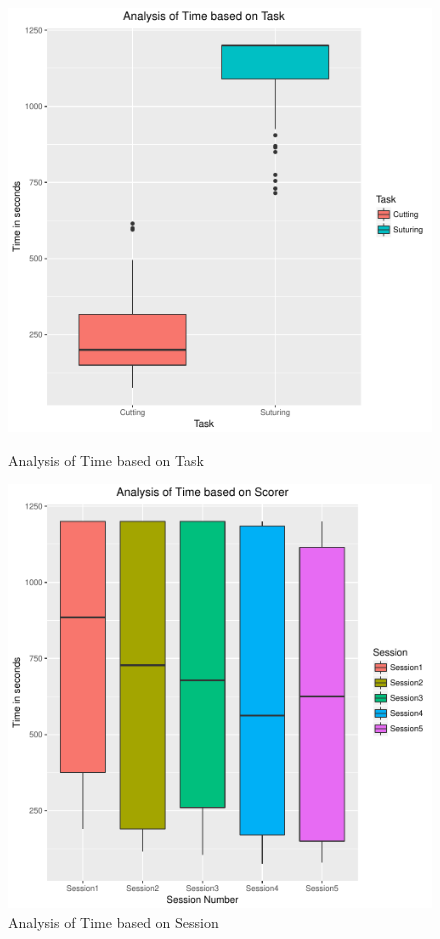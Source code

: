 \documentclass[12pt,epsf]{report}
\begin{document}
\begin{figure}[!htb]
	\begin{minipage}[c]{0.5\linewidth}
	\includegraphics[width=\linewidth]{TaskVsTime.pdf}
	\caption{Analysis of Time based on Task}
	\end{minipage}
	\hfill
	\begin{minipage}[c]{0.5\linewidth}
	\includegraphics[width=\linewidth]{SessionVsTime.pdf}
	\caption{Analysis of Time based on Session}
	\end{minipage}
\end{figure}\\
\end{document}
